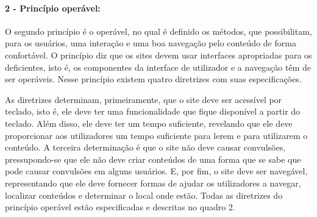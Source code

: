 \documentclass[a4paper]{article}
\begin{document}
\begin{titlepage}
\paragraph{2 - Princípio operável: }

O segundo princípio é o operável, no qual é definido os métodos, que possibilitam, para os usuários, uma interação e uma boa navegação pelo conteúdo de forma confortável. O princípio diz que os sites devem usar interfaces apropriadas para os deficientes, isto é, os componentes da interface de utilizador e a navegação têm de ser operáveis. Nesse princípio existem quatro diretrizes com suas especificações.

As diretrizes determinam, primeiramente, que o site deve ser acessível por teclado, isto é, ele deve ter uma funcionalidade que fique disponível a partir do teclado. Além disso, ele deve ter um tempo suficiente, revelando que ele deve proporcionar aos utilizadores um tempo suficiente para lerem e para utilizarem o conteúdo. A terceira determinação é que o site não deve causar convulsões, pressupondo-se que ele não deve criar conteúdos de uma forma que se sabe que pode causar convulsões em alguns usuários. E, por fim, o site deve ser navegável, representando que ele deve fornecer formas de ajudar os utilizadores a navegar, localizar conteúdos e determinar o local onde estão. Todas as diretrizes do princípio operável estão especificadas e descritas no quadro 2.\\


\end{titlepage}
\end{document}

